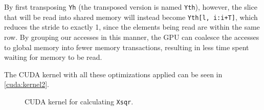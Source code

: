 By first transposing \texttt{Yh} (the transposed version is named
\texttt{Yth}), however, the slice that will be read into shared memory will
instead become \texttt{Yth[l, i:i+T]}, which reduces the stride to exactly 1,
since the elements being read are within the same row.
By grouping our accesses in this manner, the GPU can coalesce the accesses to
global memory into fewer memory transactions, resulting in less time spent
waiting for memory to be read.

The CUDA kernel with all these optimizations applied can be seen in
\autoref{cuda:kernel2}.

\begin{figure}[H]
    \centering
    \caption{CUDA kernel for calculating \texttt{Xsqr}.}
    \label{cuda:kernel2}
\end{figure}






